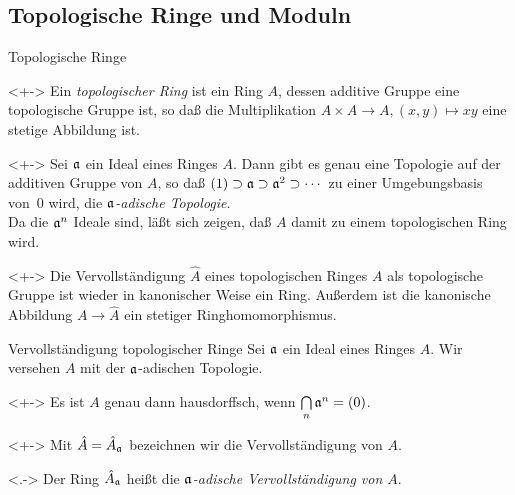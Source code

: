 \subsection{Topologische Ringe und Moduln}

\begin{frame}{Topologische Ringe}
	\begin{definition}<+->
		Ein \emph{topologischer Ring} ist ein Ring \(A\), dessen additive Gruppe eine topologische Gruppe ist, so
		daß die Multiplikation \(A \times A \to A, (x, y) \mapsto x y\) eine stetige Abbildung ist.
	\end{definition}
	\begin{example}<+->
		Sei \(\mathfrak{a}\) ein Ideal eines Ringes \(A\). Dann gibt es genau eine Topologie auf
		der additiven Gruppe von \(A\), so daß \((1) \supset \mathfrak{a} \supset \mathfrak{a}^2 \supset \dotsb\) zu einer
		Umgebungsbasis von~\(0\) wird, die \emph{\(\mathfrak{a}\)-adische Topologie}.
		\\
		Da die \(\mathfrak{a}^n\) Ideale sind, läßt sich zeigen, daß \(A\) damit zu einem topologischen Ring wird.
	\end{example}
	\begin{remark}<+->
		Die Vervollständigung \(\hat A\) eines topologischen Ringes \(A\) als topologische Gruppe ist wieder in kanonischer Weise
		ein Ring. Außerdem ist die kanonische Abbildung \(A \to \hat A\) ein stetiger Ringhomomorphismus.
	\end{remark}
\end{frame}

\begin{frame}{Vervollständigung topologischer Ringe}
	Sei \(\mathfrak{a}\) ein Ideal eines Ringes \(A\). Wir versehen \(A\) mit der \(\mathfrak{a}\)-adischen Topologie.
	\begin{example}<+->
		Es ist \(A\) genau dann hausdorffsch, wenn \(\bigcap\limits_n \mathfrak{a}^n = (0)\).
	\end{example}
	\begin{visibleenv}<+->
		Mit \(\hat A = \hat A_{\mathfrak{a}}\) bezeichnen wir die Vervollständigung von \(A\).
	\end{visibleenv}
	\begin{definition}<.->
		Der Ring \(\hat A_{\mathfrak{a}}\) heißt die \emph{\(\mathfrak{a}\)-adische Vervollständigung von \(A\)}.
	\end{definition}
\end{frame}

